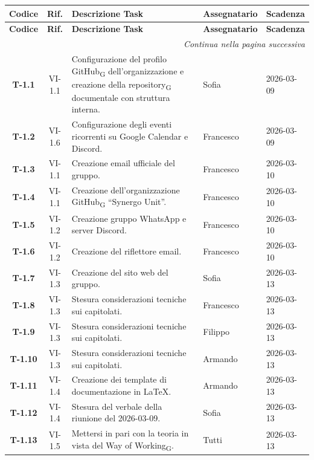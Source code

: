 \begin{longtable}{c c p{7.5cm} l l}
    \toprule
    \textbf{Codice} & \textbf{Rif.} & \textbf{Descrizione Task} & \textbf{Assegnatario} & \textbf{Scadenza} \\
    \midrule
    \endfirsthead

    \toprule
    \textbf{Codice} & \textbf{Rif.} & \textbf{Descrizione Task} & \textbf{Assegnatario} & \textbf{Scadenza} \\
    \midrule
    \endhead

    \midrule
    \multicolumn{5}{r}{\textit{Continua nella pagina successiva}} \\
    \midrule
    \endfoot

    \bottomrule
    \endlastfoot

    \textbf{T-1.1} & VI-1.1 & Configurazione del profilo GitHub\textsubscript{G} dell’organizzazione e creazione della repository\textsubscript{G} documentale con struttura interna. & Sofia & 2026-03-09 \\
    \textbf{T-1.2} & VI-1.6 & Configurazione degli eventi ricorrenti su Google Calendar e Discord. & Francesco & 2026-03-09 \\

    \textbf{T-1.3} & VI-1.1 & Creazione email ufficiale del gruppo. & Francesco & 2026-03-10 \\
    \textbf{T-1.4} & VI-1.1 & Creazione dell’organizzazione GitHub\textsubscript{G} “Synergo Unit”. & Francesco & 2026-03-10 \\
    \textbf{T-1.5} & VI-1.2 & Creazione gruppo WhatsApp e server Discord. & Francesco & 2026-03-10 \\
    \textbf{T-1.6} & VI-1.2 & Creazione del riflettore email. & Francesco & 2026-03-10 \\

    \textbf{T-1.7} & VI-1.3 & Creazione del sito web del gruppo. & Sofia & 2026-03-13 \\
    \textbf{T-1.8} & VI-1.3 & Stesura considerazioni tecniche sui capitolati. & Francesco & 2026-03-13 \\
    \textbf{T-1.9} & VI-1.3 & Stesura considerazioni tecniche sui capitolati. & Filippo & 2026-03-13 \\
    \textbf{T-1.10} & VI-1.3 & Stesura considerazioni tecniche sui capitolati. & Armando & 2026-03-13 \\
    \textbf{T-1.11} & VI-1.4 & Creazione dei template di documentazione in LaTeX. & Armando & 2026-03-13 \\
    \textbf{T-1.12} & VI-1.4 & Stesura del verbale della riunione del 2026-03-09. & Sofia & 2026-03-13 \\
    \textbf{T-1.13} & VI-1.5 & Mettersi in pari con la teoria in vista del Way of Working\textsubscript{G}. & Tutti & 2026-03-13 \\
\end{longtable}

